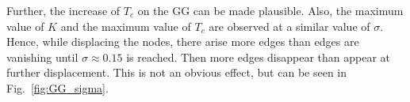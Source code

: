         Further, the increase of \(T_c\) on the GG can be made plausible.
        Also, the maximum value of \(K\) and the maximum value of \(T_c\)
        are observed at a similar value of \(\sigma\). Hence, while displacing the nodes, there arise more edges
        than edges are vanishing until \(\sigma \approx 0.15\) is reached.
        Then more edges disappear than appear at further displacement. This
        is not an obvious effect, but can be seen in Fig.\ \ref{fig:GG_sigma}.
        \begin{figure}[htb]


\end{figure}
